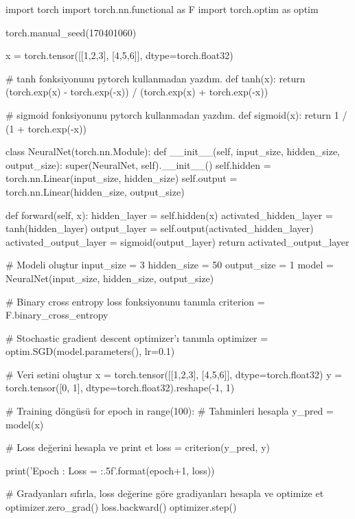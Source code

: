 \documentclass[11pt]{article}
\begin{document}
\begin{python}
import torch
import torch.nn.functional as F
import torch.optim as optim

torch.manual_seed(170401060)

x = torch.tensor([[1,2,3], [4,5,6]], dtype=torch.float32)

# tanh fonksiyonunu pytorch kullanmadan yazdım.
def tanh(x):
    return (torch.exp(x) - torch.exp(-x)) / (torch.exp(x) + torch.exp(-x))

# sigmoid fonksiyonunu pytorch kullanmadan yazdım.
def sigmoid(x):
    return 1 / (1 + torch.exp(-x))

class NeuralNet(torch.nn.Module):
    def __init__(self, input_size, hidden_size, output_size):
        super(NeuralNet, self).__init__()
        self.hidden = torch.nn.Linear(input_size, hidden_size)
        self.output = torch.nn.Linear(hidden_size, output_size)

    def forward(self, x):
        hidden_layer = self.hidden(x)
        activated_hidden_layer = tanh(hidden_layer)
        output_layer = self.output(activated_hidden_layer)
        activated_output_layer = sigmoid(output_layer)
        return activated_output_layer

# Modeli oluştur
input_size = 3
hidden_size = 50
output_size = 1
model = NeuralNet(input_size, hidden_size, output_size)

# Binary cross entropy loss fonksiyonunu tanımla
criterion = F.binary_cross_entropy

# Stochastic gradient descent optimizer'ı tanımla
optimizer = optim.SGD(model.parameters(), lr=0.1)

# Veri setini oluştur
x = torch.tensor([[1,2,3], [4,5,6]], dtype=torch.float32)
y = torch.tensor([0, 1], dtype=torch.float32).reshape(-1, 1)

# Training döngüsü
for epoch in range(100):
    # Tahminleri hesapla
    y_pred = model(x)

    # Loss değerini hesapla ve print et
    loss = criterion(y_pred, y)
    
    print('Epoch {}: Loss = {:.5f}'.format(epoch+1, loss))

    # Gradyanları sıfırla, loss değerine göre gradiyanları hesapla ve optimize et
    optimizer.zero_grad()
    loss.backward()
    optimizer.step()
\end{python}
\end{document}

